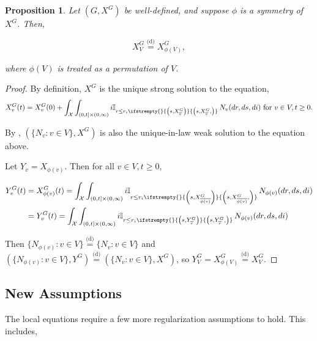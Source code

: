\documentclass[12pt]{article}
\newcommand{\mb}{\mathbb}
\newcommand{\mc}{\mathcal}
\newcommand{\ov}{\overline}
\newcommand{\te}{\text}
\newcommand{\ind}{\hspace{24pt}}
\newcommand{\deq}{\overset{\text{(d)}}{=}}			%
\newcommand{\sta}{\mc{X}}							%
\newcommand{\cl}[1]{\ov{#1}}						%
\newcommand{\Xf}{X}									%
\newcommand{\poiss}{N}								%
\newcommand{\rate}{r}								%
\newcommand{\poissv}[1]{_{#1}}						%
\newcommand{\vind}[1]{_{#1}}						%
\newcommand{\tme}[1]{(#1)}							%
\newcommand{\gind}[1]{^{#1}}						%
\newcommand{\stpara}[1]{_{#1}}						%
\newcommand{\tmepro}[3]{
\ifstrempty{#3}{
	\left(#1,#2\right)}{
	\left(#1,#2,#3\right)}}							%
\newcommand{\Xg}{Y}									%
\newtheorem{prop}[thms]{Proposition}
\begin{document}
\begin{prop}
Let \((G,\Xf\gind{G})\) be well-defined, and suppose \(\phi\) is a symmetry of \(\Xf\gind{G}\). Then,

\[\Xf\gind{G}\vind{V} \deq \Xf\gind{G}\vind{\phi(V)},\]

where \(\phi(V)\) is treated as a permutation of \(V\).
\label{a::simprop}
\end{prop}
\begin{proof}
By definition, \(\Xf\gind{G}\) is the unique strong solution to the equation,
\[\Xf\gind{G}\vind{v}\tme{t} = \Xf\gind{G}\vind{v}\tme{0} + \int_\sta\int_{(0,t]\times(0,\infty)} i\mb{I}_{r \leq \rate\stpara{i}\tmepro{s}{\Xf\gind{G}\vind{\cl{v}}}{}}\,\poiss\poissv{v}(dr,ds,di) \te{ for } v \in V, t \geq 0.\]

By \cite[Proposition 2.10]{Kur07}, \((\{\poiss\poissv{v}:v\in V\},\Xf\gind{G})\) is also the unique-in-law weak solution to the equation above.

\ind Let \(\Xg\vind{v} = \Xf\vind{\phi(v)}\). Then for all \(v\in V,t\geq 0\),

\begin{align*}
\Xg\gind{G}\vind{v}\tme{t} &= \Xf\gind{G}\vind{\phi(v)}\tme{t} = \int_\sta\int_{(0,t]\times(0,\infty)} i\mb{I}_{r \leq \rate\stpara{i}\tmepro{s}{\Xf\gind{G}\vind{\cl{\phi(v)}}}{}}\,\poiss\poissv{\phi(v)}(dr,ds,di)\\
&= \Xg\gind{G}\vind{v}\tme{t} = \int_\sta\int_{(0,t]\times(0,\infty)} i\mb{I}_{r \leq \rate\stpara{i}\tmepro{s}{\Xg\gind{G}\vind{\cl{v}}}{}}\,\poiss\poissv{\phi(v)}(dr,ds,di)\\
\end{align*}

Then \(\{\poiss\poissv{\phi(v)}:v \in V\} \deq \{\poiss\poissv{v}:v\in V\}\) and \((\{\poiss\poissv{\phi(v)}:v \in V\},\Xg\gind{G}) \deq (\{\poiss\poissv{v}:v \in V\},\Xf\gind{G})\), so \(\Xg\gind{G}\vind{V} = \Xf\gind{G}\vind{\phi(V)} \deq \Xf\gind{G}\vind{V}\).
\end{proof}



\subsection{New Assumptions}
\label{a::not}

The local equations require a few more regularization assumptions to hold. This includes,
\end{document}
